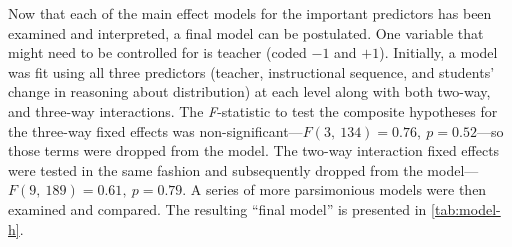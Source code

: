 \documentclass[11pt]{umnthesis}
\begin{document}
Now that each of the main effect models for the important predictors has been examined and interpreted, a final model can be postulated. One variable that might need to be controlled for is teacher (coded \(-1\) and \(+1\)). Initially, a model was fit using all three predictors (teacher, instructional sequence, and students' change in reasoning about distribution) at each level along with both two-way, and three-way interactions. The \emph{F}-statistic to test the composite hypotheses for the three-way fixed effects was non-significant---\(F(3,~134)=0.76,~p=0.52\)---so those terms were dropped from the model. The two-way interaction fixed effects were tested in the same fashion and subsequently dropped from the model---\(F(9,~189)=0.61,~p=0.79\). A series of more parsimonious models were then examined and compared. The resulting ``final model'' is presented in \ref{tab:model-h}.
\end{document}
